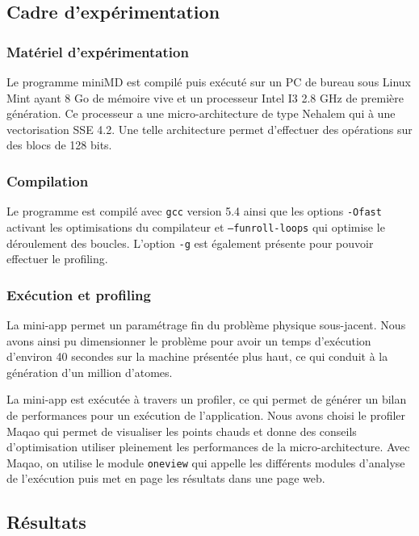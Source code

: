 \documentclass[11pt,a4paper]{article}
\begin{document}
	\subsection{Cadre d'expérimentation}
		
		\subsubsection{Matériel d'expérimentation}

			Le programme miniMD est compilé puis exécuté sur un PC de bureau sous Linux Mint ayant 8 Go de mémoire vive et un processeur Intel I3 2.8 GHz de première génération. Ce processeur a une micro-architecture de type Nehalem qui à une vectorisation SSE 4.2. Une telle architecture permet d'effectuer des opérations sur des blocs de 128 bits.

		\subsubsection{Compilation}

			Le programme est compilé avec \texttt{gcc} version 5.4 ainsi que les options \texttt{-Ofast} activant les optimisations du compilateur et \texttt{--funroll-loops} qui optimise le déroulement des boucles. L'option \texttt{-g} est également présente pour pouvoir effectuer le profiling.

		\subsubsection{Exécution et profiling}

			La mini-app permet un paramétrage fin du problème physique sous-jacent. Nous avons ainsi pu dimensionner le problème pour avoir un temps d'exécution d'environ 40 secondes sur la machine présentée plus haut, ce qui conduit à la génération d'un million d'atomes.

			La mini-app est exécutée à travers un profiler, ce qui permet de générer un bilan de performances pour un exécution de l'application. Nous avons choisi le profiler Maqao qui permet de visualiser les points chauds et donne des conseils d'optimisation utiliser pleinement les performances de la micro-architecture. Avec Maqao, on utilise le module \texttt{oneview} qui appelle les différents modules d'analyse de l'exécution puis met en page les résultats dans une page web.

	\subsection{Résultats}
\end{document}
